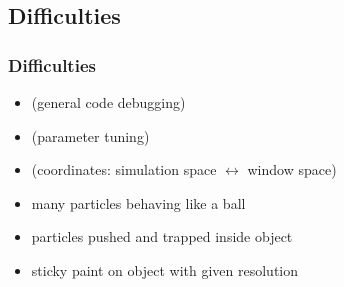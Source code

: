 \subsection{Difficulties}
\begin{frame}
	\frametitle{Difficulties}
	\begin{itemize}
		\item (general code debugging)
		\item (parameter tuning)
		\item (coordinates: simulation space $\leftrightarrow$ window space)
		\item many particles behaving like a ball
		\item particles pushed and trapped inside object
		\item sticky paint on object with given resolution
	\end{itemize}
\end{frame}

